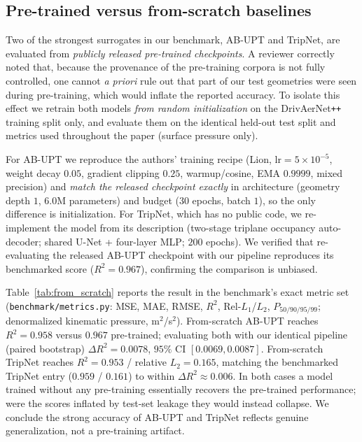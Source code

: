 \subsection{Pre-trained versus from-scratch baselines}
\label{sec:from_scratch}

Two of the strongest surrogates in our benchmark, AB-UPT and TripNet, are evaluated from
\emph{publicly released pre-trained checkpoints}. A reviewer correctly noted that, because the
provenance of the pre-training corpora is not fully controlled, one cannot \emph{a priori} rule
out that part of our test geometries were seen during pre-training, which would inflate the
reported accuracy. To isolate this effect we retrain both models \emph{from random
initialization} on the DrivAerNet\texttt{++} training split only, and evaluate them on the
identical held-out test split and metrics used throughout the paper (surface pressure only).

For AB-UPT we reproduce the authors' training recipe (Lion, $\mathrm{lr}=5\times10^{-5}$, weight
decay $0.05$, gradient clipping $0.25$, warmup/cosine, EMA $0.9999$, mixed precision) and
\emph{match the released checkpoint exactly} in architecture (geometry depth $1$, $6.0$M
parameters) and budget ($30$ epochs, batch $1$), so the only difference is initialization. For
TripNet, which has no public code, we re-implement the model from its description (two-stage
triplane occupancy auto-decoder; shared U-Net + four-layer MLP; $200$ epochs). We verified that
re-evaluating the released AB-UPT checkpoint with our pipeline reproduces its benchmarked score
($R^2=0.967$), confirming the comparison is unbiased.

Table~\ref{tab:from_scratch} reports the result in the benchmark's exact metric set
(\texttt{benchmark/metrics.py}: MSE, MAE, RMSE, $R^2$, Rel-$L_1$/$L_2$, $P_{50/90/95/99}$;
denormalized kinematic pressure, m$^2$/s$^2$). From-scratch AB-UPT reaches $R^2=0.958$ versus
$0.967$ pre-trained; evaluating both with our identical pipeline (paired bootstrap)
$\Delta R^2 = 0.0078$, $95\%$ CI $[0.0069, 0.0087]$. From-scratch TripNet reaches $R^2=0.953$ /
relative $L_2 = 0.165$, matching the benchmarked TripNet entry ($0.959$ / $0.161$) to within
$\Delta R^2\!\approx\!0.006$. In both cases a model trained without any pre-training essentially
recovers the pre-trained performance; were the scores inflated by test-set leakage they would
instead collapse. We conclude the strong accuracy of AB-UPT and TripNet reflects genuine
generalization, not a pre-training artifact.

